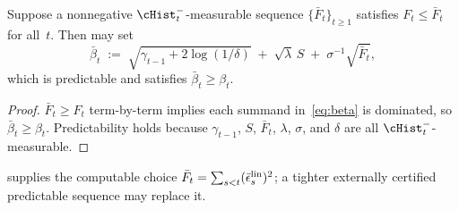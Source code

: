 \begin{corollary}\label{cor:beta-constructive}
Suppose a nonnegative $\cHist_t^-$-measurable sequence
$\{\bar F_t\}_{t\ge 1}$
satisfies $F_t \le \bar F_t$ for all~$t$.
Then  may set
\[
  \bar\beta_t \;:=\;
  \sqrt{\gamma_{t-1} + 2\log(1/\delta)}
  \;+\; \sqrt{\lambda}\,S
  \;+\; \sigma^{-1}\sqrt{\bar F_t},
\]
which is predictable and satisfies $\bar\beta_t \ge \beta_t$.
\end{corollary}
\begin{proof}
$\bar F_t \ge F_t$ term-by-term implies each summand in~\eqref{eq:beta}
is dominated, so $\bar\beta_t \ge \beta_t$.
Predictability holds because $\gamma_{t-1}$, $S$, $\bar F_t$, $\lambda$,
$\sigma$, and $\delta$ are all $\cHist_t^-$-measurable.
\end{proof}

\noindent
{} supplies the computable choice
$\bar F_t=\sum_{s<t}(\bar\epsilon_s^{\rm lin})^2$; a tighter externally
certified predictable sequence may replace it.


